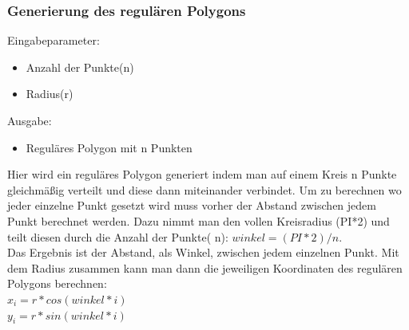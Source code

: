 	\subsubsection{Generierung des regulären Polygons}
		Eingabeparameter: 
		\begin{itemize}
			\item Anzahl der Punkte(n)
			\item Radius(r)
		\end{itemize}
		Ausgabe:
		\begin{itemize} 
			\item Reguläres Polygon mit n Punkten
		\end{itemize}
		Hier wird ein reguläres Polygon generiert indem man auf einem Kreis n 
		Punkte gleichmäßig verteilt und diese dann miteinander verbindet. Um 
		zu berechnen wo jeder einzelne Punkt gesetzt wird muss vorher der 
		Abstand zwischen jedem Punkt berechnet werden. Dazu nimmt man den 
		vollen Kreisradius (PI*2) und teilt diesen durch die Anzahl der Punkte(
		n): $winkel = (PI * 2) / n$.\\ 
		Das Ergebnis ist der Abstand, als Winkel, zwischen jedem einzelnen 
		Punkt.
		Mit dem Radius zusammen kann man dann die jeweiligen Koordinaten des 
		regulären Polygons berechnen:\\
		$x_i = r * cos(winkel * i)$\\
		$y_i = r * sin(winkel * i)$

